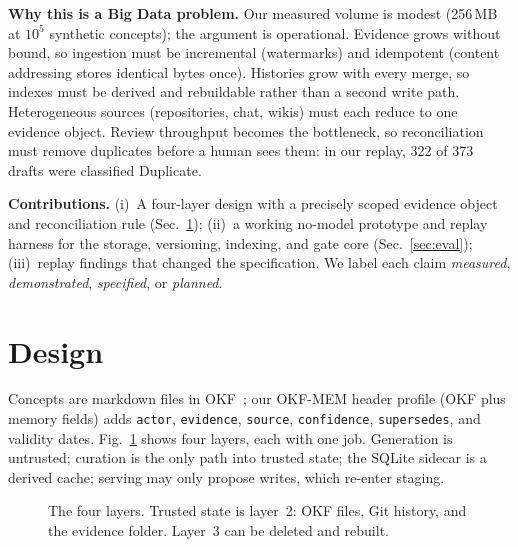 \documentclass[conference,letterpaper]{IEEEtran}
\begin{document}
\textbf{Why this is a Big Data problem.} Our measured volume is modest (256\,MB at $10^5$ synthetic concepts); the argument is operational. Evidence grows without bound, so ingestion must be incremental (watermarks) and idempotent (content addressing stores identical bytes once). Histories grow with every merge, so indexes must be derived and rebuildable rather than a second write path. Heterogeneous sources (repositories, chat, wikis) must each reduce to one evidence object. Review throughput becomes the bottleneck, so reconciliation must remove duplicates before a human sees them: in our replay, 322 of 373 drafts were classified Duplicate.

\textbf{Contributions.} (i)~A four-layer design with a precisely scoped evidence object and reconciliation rule (Sec.~\ref{sec:arch}); (ii)~a working no-model prototype and replay harness for the storage, versioning, indexing, and gate core (Sec.~\ref{sec:eval}); (iii)~replay findings that changed the specification. We label each claim \emph{measured}, \emph{demonstrated}, \emph{specified}, or \emph{planned}.

\section{Design}\label{sec:arch}
Concepts are markdown files in OKF~\cite{okf}; our OKF-MEM header profile (OKF plus memory fields) adds \texttt{actor}, \texttt{evidence}, \texttt{source}, \texttt{confidence}, \texttt{supersedes}, and validity dates. Fig.~\ref{fig:layers} shows four layers, each with one job. Generation is untrusted; curation is the only path into trusted state; the SQLite sidecar is a derived cache; serving may only propose writes, which re-enter staging.

\begin{figure}[t]
\centering
{}
\caption{The four layers. Trusted state is layer~2: OKF files, Git history, and the evidence folder. Layer~3 can be deleted and rebuilt.}
\label{fig:layers}
\end{figure}
\end{document}
